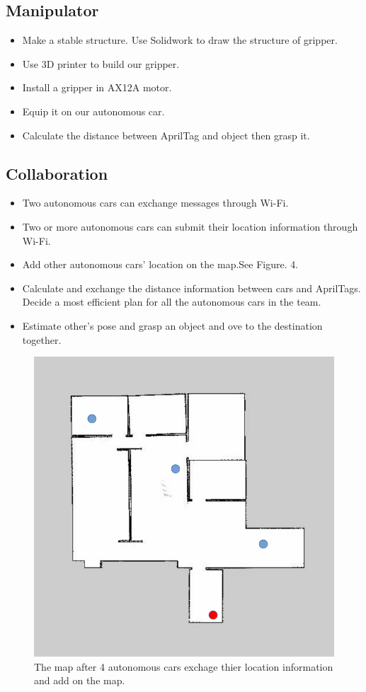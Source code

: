 \documentclass[a4paper, 10pt, conference]{ieeeconf}      %
\begin{document}
\subsection{Manipulator}
\begin{itemize}
	\item Make a stable structure. Use Solidwork to draw the structure of gripper.
	\item Use 3D printer to build our gripper.
	\item Install a gripper in AX12A motor.
	\item Equip it on our autonomous car.
	\item Calculate the distance between AprilTag and object then grasp it.
\end{itemize}



\subsection{Collaboration}
\begin{itemize}
	\item Two autonomous cars can exchange messages through Wi-Fi.
	\item Two or more autonomous cars can submit their location information through Wi-Fi.
	\item Add other autonomous cars’ location on the map.See Figure. 4.
	\item Calculate and exchange the distance information between cars and AprilTags. Decide a most efficient plan for all the autonomous cars in the team.
	\item Estimate other’s pose and grasp an object and ove to the destination together.
\end{itemize}

\begin{figure}[h]
\includegraphics[width=0.95\columnwidth]{collaboration}
\centering
\caption{The map after 4 autonomous cars exchage thier location information and add on the map.}
\end{figure}
\end{document}
